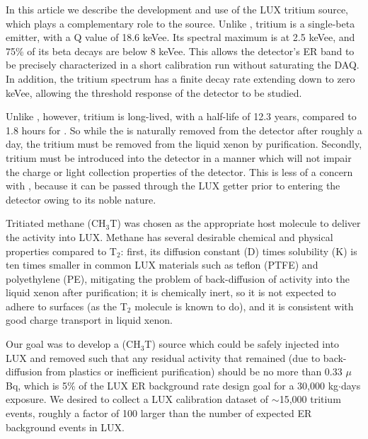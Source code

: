 In this article we describe the development and use of the LUX tritium source, which plays a complementary role to the \krsrc source. Unlike \krsrc, tritium is a single-beta emitter, with a Q value of 18.6 keVee. Its spectral maximum is at 2.5 keVee, and 75\% of its beta decays are below 8 keVee. This allows the detector's ER band to be precisely characterized in a short calibration run without saturating the DAQ. In addition, the tritium spectrum has a finite decay rate extending down to zero keVee, allowing the threshold response of the detector to be studied.

Unlike \krsrc, however, tritium is long-lived, with a half-life of 12.3 years, compared to 1.8 hours for \krsrc. So while the \krsrc is naturally removed from the detector after roughly a day, the tritium must be removed from the liquid xenon by purification. Secondly, tritium must be introduced into the detector in a manner which will not impair the charge or light collection properties of the detector. This is less of a concern with \krsrc, because it can be passed through the LUX getter prior to entering the detector owing to its noble nature. 

Tritiated methane (CH$_3$T) was chosen as the appropriate host molecule to deliver the activity into LUX. Methane has several desirable chemical and physical properties compared to T$_2$: first, its diffusion constant (D) times solubility (K) is ten times smaller in common LUX materials such as teflon (PTFE) and polyethylene (PE), mitigating the problem of back-diffusion of activity into the liquid xenon after purification; it is chemically inert, so it is not expected to adhere to surfaces (as the T$_2$ molecule is known to do), and it is consistent with good charge transport in liquid xenon.

Our goal was to develop a (CH$_3$T) source which could be safely injected into LUX and removed such that any residual activity that remained (due to back-diffusion from plastics or inefficient purification) should be no more than 0.33 $\mu$Bq, which is 5\% of the LUX ER background rate design goal for a 30,000 kg$\cdot$days exposure. We desired to collect a LUX calibration dataset of $\sim$15,000 tritium events, roughly a factor of 100 larger than the number of expected ER background events in LUX. 
